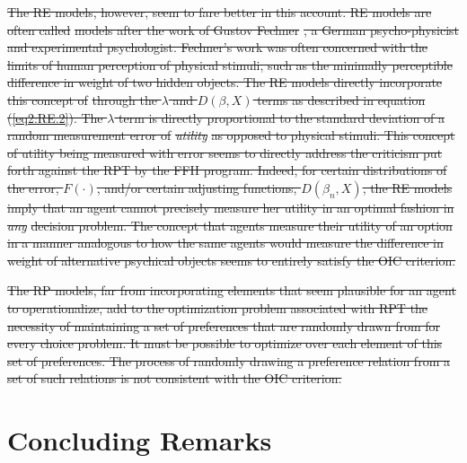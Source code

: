 \documentclass[11pt,a4paper]{report}
\providecommand{\DIFdeltex}[1]{{\protect\color{red}\sout{#1}}}                      %
\providecommand{\DIFdelend}{} %
\providecommand{\DIFdel}[1]{\texorpdfstring{\DIFdeltex{#1}}{}} %
\DeclareRobustCommand{\DIFdelend}{\DIFOaddend \let\includegraphics\DIFOincludegraphics} %
\begin{document}
\DIFdel{The RE models, however, seem to fare better in this account.
RE models are often called }%
\DIFdel{models after the work of Gustov Fechner }%
\DIFdel{, a German psycho-physicist and experimental psychologist.
Fechner's work was often concerned with the limits of human perception of physical stimuli, such as the minimally perceptible difference in weight of two hidden objects.
The RE models directly incorporate this concept of }%
\DIFdel{through the $\lambda$ and $D(\beta,X)$ terms as described in equation (\ref{eq2:RE.2}).
The $\lambda$ term is directly proportional to the standard deviation of a random measurement error of }\textit{\DIFdel{utility}} %
\DIFdel{as opposed to physical stimuli.
This concept of utility being measured with error seems to directly address the criticism put forth against the RPT by the FFH program.
Indeed, for certain distributions of the error, $F(\cdot)$, and/or certain adjusting functions, $D(\beta_n,X)$, the RE models imply that an agent cannot precisely measure her utility in an optimal fashion in }\textit{\DIFdel{any}} %
\DIFdel{decision problem.
The concept that agents measure their utility of an option in a manner analogous to how the same agents would measure the difference in weight of alternative psychical objects seems to entirely satisfy the OIC criterion.
}%

\DIFdel{The RP models, far from incorporating elements that seem plausible for an agent to operationalize, add to the optimization problem associated with RPT the necessity of maintaining a set of preferences that are randomly drawn from for every choice problem.
It must be possible to optimize over each element of this set of preferences.
The process of randomly drawing a preference relation from a set of such relations is not consistent with the OIC criterion.
}%

\DIFdelend \section{Concluding Remarks}
\end{document}
